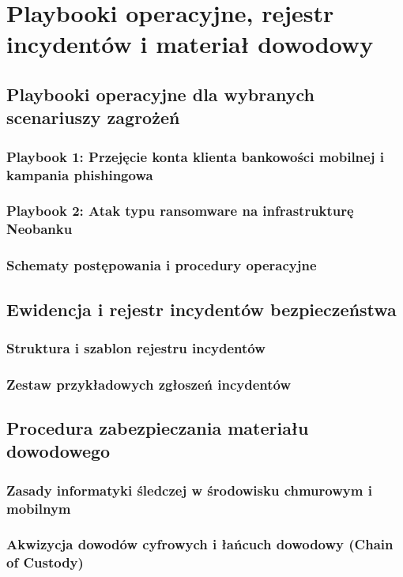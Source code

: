 \chapter{Playbooki operacyjne, rejestr incydentów i materiał dowodowy}\label{ch:playbooki-operacyjne}

\section{Playbooki operacyjne dla wybranych scenariuszy zagrożeń}\label{sec:playbooki-operacyjne}

\subsection{Playbook 1: Przejęcie konta klienta bankowości mobilnej i kampania phishingowa}\label{subsec:playbook-phishing-ato}

\subsection{Playbook 2: Atak typu ransomware na infrastrukturę Neobanku}\label{subsec:playbook-ransomware}

\subsection{Schematy postępowania i procedury operacyjne}\label{subsec:schematy-postepowania}

\section{Ewidencja i rejestr incydentów bezpieczeństwa}\label{sec:rejestr-incydentow}

\subsection{Struktura i szablon rejestru incydentów}\label{subsec:szablon-rejestru}

\subsection{Zestaw przykładowych zgłoszeń incydentów}\label{subsec:przykladowe-zgloszenia}

\section{Procedura zabezpieczania materiału dowodowego}\label{sec:material-dowodowy}

\subsection{Zasady informatyki śledczej w środowisku chmurowym i mobilnym}\label{subsec:zasady-forensics}

\subsection{Akwizycja dowodów cyfrowych i łańcuch dowodowy (Chain of Custody)}\label{subsec:lancuch-dowodowy}
